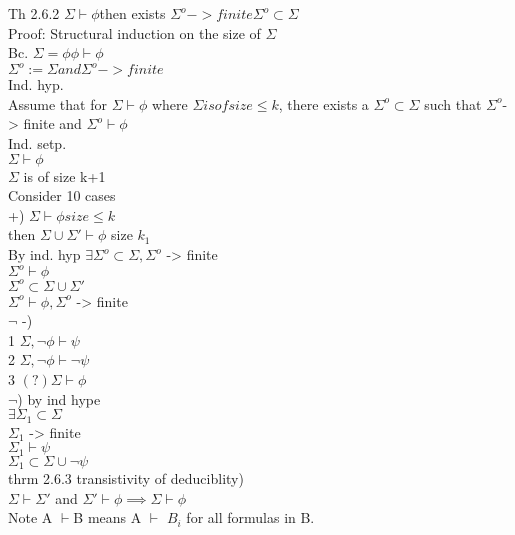 \documentclass[12pt,oneside,fleqn]{article}
\theoremstyle{definition}
\begin{document}
Th 2.6.2 $\Sigma \vdash \phi $then exists $\Sigma^o -> finite \Sigma^o \subset \Sigma$ \\
Proof: Structural induction on the size of $\Sigma$ \\
Bc. $\Sigma = {\phi} \phi \vdash \phi$ \\
$\Sigma^o := \Sigma and \Sigma^o -> finite$ \\
Ind. hyp. \\
Assume that for $\Sigma \vdash \phi$ where $\Sigma is of size \leq k$, there exists a $\Sigma^o \subset \Sigma$ such that $\Sigma^o $-> finite and $\Sigma^o \vdash \phi$  \\
Ind. setp. \\
$\Sigma \vdash \phi$ \\
$\Sigma$ is of size k+1 \\
Consider 10 cases \\
+) $\Sigma \vdash \phi size \leq k$ \\
then $\Sigma \cup \Sigma' \vdash \phi$ size $k_1$ \\
By ind. hyp $\exists \Sigma^o \subset \Sigma , \Sigma^o$ -> finite \\
$\Sigma^o \vdash \phi$ \\
$\Sigma^o \subset \Sigma \cup \Sigma'$ \\
$\Sigma^o \vdash \phi, \Sigma^o$ -> finite \\
$\neg$ -) \\
1 $\Sigma, \neg \phi \vdash \psi$ \\
2 $\Sigma, \neg \phi \vdash \neg \psi$ \\
3 $(?) \Sigma \vdash \phi$ \\
$\neg$) by ind hype \\
$\exists \Sigma_1 \subset \Sigma$ \\
$\Sigma_1$ -> finite \\
$\Sigma_1 \vdash \psi$ \\
$\Sigma_1 \subset \Sigma \cup {\neg\psi }$ \\

thrm 2.6.3 transistivity of deduciblity) \\
$\Sigma \vdash \Sigma'$ and $\Sigma' \vdash \phi \implies \Sigma \vdash \phi$ \\
Note A $\vdash $B means A $\vdash$ $B_i$ for all formulas in B. 
\end{document}

